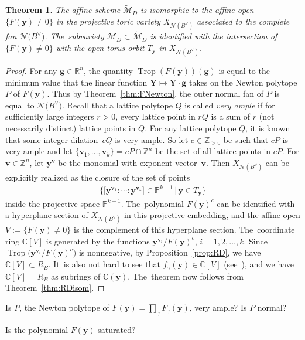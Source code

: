 \documentclass[10pt,a4paper]{amsart}
\def\R{{\mathbb R}}
\def\C{{\mathbb C}}
\def\Z{{\mathbb Z}}
\def\M{{\mathcal{M}}}
\def\tM{{\widetilde {\mathcal{M}}}}
\def\y{{\mathbf y}}
\def\v{{\mathbf v}}
\def\N{{\mathcal{N}}}
\def\Trop{\operatorname{Trop}}
\def\g{{\mathbf g}}
\def\Y{{\mathbf Y}}
\renewcommand{\P}{{\mathbb P}}
\numberwithin{equation}{section}
\newtheorem{Theorem}{Theorem}[section]
\begin{document}
\begin{Theorem}\label{thm:toric}
The affine scheme $\tM_D$ is isomorphic to the affine open $\{F(\y) \neq 0\}$ in the projective toric variety $X_{\N(B^\vee)}$ associated to the complete fan $\N\big(B^\vee\big)$. The~subvariety \mbox{$\M_D \subset \tM_D$} is identified with the intersection of $\{F(\y) \neq 0\}$ with the open torus orbit $T_\y$ in $X_{\N(B^\vee)}$.
\end{Theorem}
\begin{proof}
For any $\g \in \R^n$, the quantity $\Trop(F(\y))(\g)$ is equal to the minimum value that the linear function $\Y \mapsto \Y \cdot \g$ takes on the Newton polytope $P$ of $F(\y)$. Thus by Theorem~\ref{thm:FNewton}, the outer normal fan of $P$ is equal to $\N\big(B^\vee\big)$. Recall that a lattice polytope $Q$ is called \emph{very ample} if for sufficiently large integers $r>0$, every lattice point in $rQ$ is a sum
of $r$ (not necessarily distinct) lattice points in $Q$. For any lattice polytope $Q$, it is known that some integer dilation~$cQ$ is very ample. So let $c \in \Z_{>0}$ be such that $cP$ is very ample and let $\{\v_1,\dots,\v_k\} = cP \cap \Z^n$ be the set of all lattice points in $cP$. For $\v \in \Z^n$, let $\y^\v$ be the monomial with exponent vector~$\v$. Then $X_{\N(B^\vee)}$ can be explicitly realized as the closure of the set of points
\begin{gather*}
\Big\{\big[\y^{\v_1}:\cdots: \y^{\v_k}\big] \in \P^{k-1} \,|\, \y \in T_\y \Big\}
\end{gather*}
inside the projective space $\P^{k-1}$. The~polynomial $F(\y)^c$ can be identified with a hyperplane section of $X_{\N(B^\vee)}$ in this projective embedding, and the affine open $V:=\{F(\y) \neq 0\}$ is the complement of this hyperplane section. The~coordinate ring $\C[V]$ is generated by the functions $\y^{\v_i}/F(\y)^c$, $i =1,2,\dots,k$. Since $\Trop\big(\y^{\v_i}/F(\y)^c\big)$ is nonnegative, by Proposition~\ref{prop:RD}, we have $\C[V] \subset R_B$. It~is also not hard to see that $f_\gamma(\y) \in \C[V]$ (see~\cite[Section~10]{AHL}), and we have $\C[V] = R_B$ as subrings of $\C(\y)$. The~theorem now follows from Theorem~\ref{thm:RDisom}.
\end{proof}

\begin{question}
Is $P$, the Newton polytope of $F(\y) = \prod_\gamma F_\gamma(\y)$, very ample? Is $P$ normal?
\end{question}

\begin{question}\label{q:sat}
Is the polynomial $F(\y)$ saturated?
\end{question}
\end{document}
